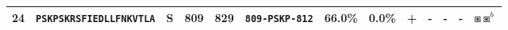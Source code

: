 \begin{tabular}{rcccccccccccc}
24 &  \texttt{PSKPSKRSFIEDLLFNKVTLA} &       S &    809 &   829 &                \texttt{{\scriptsize 809-}PSKP{\scriptsize -812}} &                          66.0\% &                            0.0\% &          + &           - &          - &           - &                                                                                                                                       $ \boxast \boxast^b $ \\
\bottomrule
\end{tabular}
